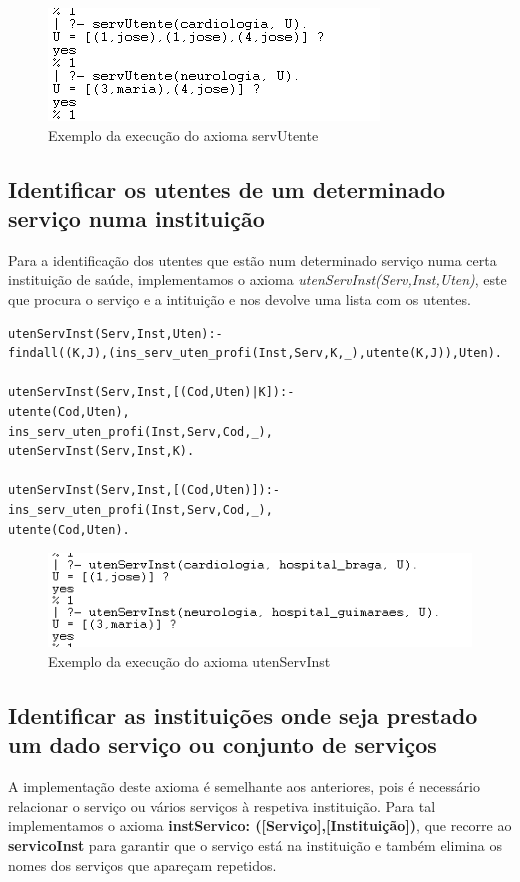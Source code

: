 \begin{figure}[<+htpb+>]
	\centering
	\includegraphics[scale=0.9]{answer3.png}
	\caption{Exemplo da execução do axioma servUtente}
	\label{p3:fig:output3}
\end{figure}

\subsection{Identificar os utentes de um determinado serviço numa instituição}
Para a identificação dos utentes que estão num determinado serviço numa certa instituição de saúde, implementamos o axioma \textit{utenServInst(Serv,Inst,Uten)}, este que procura o serviço e a intituição e nos devolve uma lista com os utentes. 
\begin{verbatim}
utenServInst(Serv,Inst,Uten):- 
findall((K,J),(ins_serv_uten_profi(Inst,Serv,K,_),utente(K,J)),Uten). 

utenServInst(Serv,Inst,[(Cod,Uten)|K]):-
utente(Cod,Uten),
ins_serv_uten_profi(Inst,Serv,Cod,_),
utenServInst(Serv,Inst,K).

utenServInst(Serv,Inst,[(Cod,Uten)]):-
ins_serv_uten_profi(Inst,Serv,Cod,_),
utente(Cod,Uten).
\end{verbatim}

\begin{figure}[<+htpb+>]
	\centering
	\includegraphics[scale=0.9]{answer4.png}
	\caption{Exemplo da execução do axioma utenServInst}
	\label{p3:fig:output4}
\end{figure}


\subsection{Identificar as instituições onde seja prestado um dado serviço ou conjunto de serviços}
A implementação deste axioma é semelhante aos anteriores, pois é necessário relacionar o serviço ou vários serviços à respetiva instituição. Para tal implementamos o axioma \textbf{instServico: ([Serviço],[Instituição])}, que recorre ao \textbf{servicoInst} para garantir que o serviço está na instituição e também elimina os nomes dos serviços que apareçam repetidos. 


